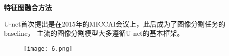 \begin{frame}
    \noindent\large\textbf{特征图融合方法}

    \vspace{1em}
    U-net首次提出是在2015年的MICCAI会议上，此后成为了图像分割任务的baseline，
    主流的图像分割模型大多遵循U-net的基本框架。

    \begin{figure}
        \texttt{[image: 6.png]}
    \end{figure}
\end{frame}

